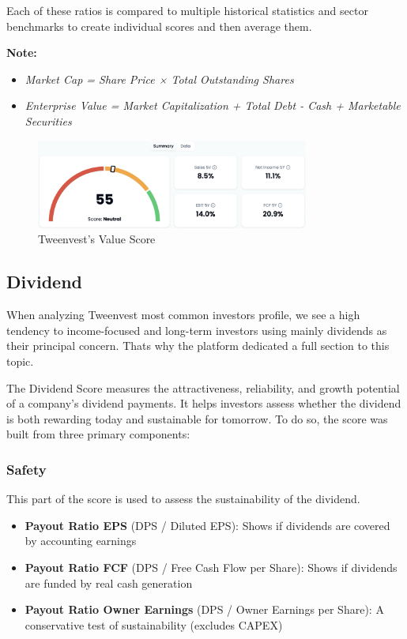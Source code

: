 \documentclass[11pt,english,a4paper,hidelinks]{book}
\begin{document}
\vspace{0.5cm}
\noindent Each of these ratios is compared to multiple historical statistics and sector benchmarks to create individual scores and then average them.

\vspace{0.5cm}
\noindent \textbf{Note:}
\begin{itemize}
    \item \textit{Market Cap = Share Price × Total Outstanding Shares}
    \item \textit{Enterprise Value = Market Capitalization + Total Debt - Cash + Marketable Securities}
\end{itemize}

\begin{figure}[H]
    \centering
    \includegraphics[width=0.8\textwidth]{images/tweenvest/value score.png}
    \caption{Tweenvest's Value Score}
    \label{fig:valuation_score}
\end{figure}


\subsection{Dividend}
\noindent When analyzing Tweenvest most common investors profile, we see a high tendency to income-focused and long-term investors using mainly dividends as their principal concern. Thats why the platform dedicated a full section to this topic. 

\vspace{0.5cm}
\noindent The Dividend Score measures the attractiveness, reliability, and growth potential of a company's dividend payments. It helps investors assess whether the dividend is both rewarding today and sustainable for tomorrow. To do so, the score was built from three primary components:

\subsubsection{Safety}
This part of the score is used to assess the sustainability of the dividend.
\begin{itemize}
    \item \textbf{Payout Ratio EPS} (DPS / Diluted EPS): Shows if dividends are covered by accounting earnings
    \item \textbf{Payout Ratio FCF} (DPS / Free Cash Flow per Share): Shows if dividends are funded by real cash generation
    \item \textbf{Payout Ratio Owner Earnings} (DPS / Owner Earnings per Share): A conservative test of sustainability (excludes CAPEX)
\end{itemize}
\end{document}
